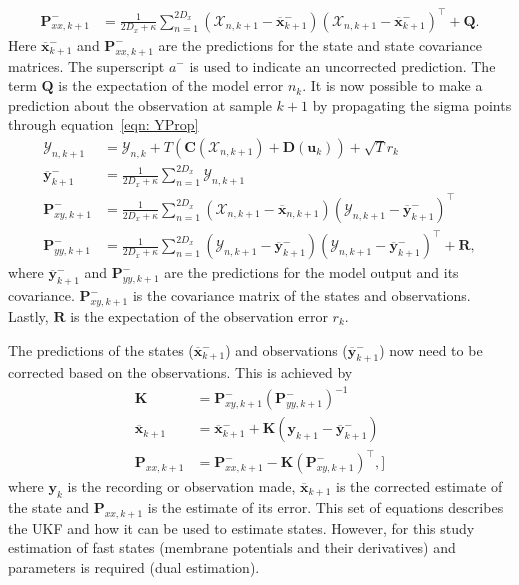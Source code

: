 \begin{align}
\mathbf{P}_{xx,k+1}^{-} &= \frac{1}{2D_{x}+\kappa}\sum_{n=1}^{2D_{x}} (\mathbf{\mathcal{X}}_{n,k+1} -\mathbf{\overline{x}}_{k+1}^{-})(\mathbf{\mathcal{X}}_{n,k+1}-\mathbf{\overline{x}}_{k+1}^{-})^{\top} + \mathbf{Q}.%
\end{align} Here $\overline{\mathbf{x}}_{k+1}^{-}$ and $\mathbf{P}_{xx,k+1}^{-}$ are the predictions for the state and state covariance matrices. The superscript $a^{-}$ is used to indicate an uncorrected prediction. The term $\mathbf{Q}$ is the expectation of the model error $n_{k}$. It is now possible to make a prediction about the observation at sample $k+1$ by propagating the sigma points through equation~\ref{eqn: YProp} \begin{align} %
\mathbf{\mathcal{Y}}_{n,k+1} &= \mathbf{\mathcal{Y}}_{n,k} + T(\mathbf{C}(\mathbf{\mathcal{X}}_{n,k+1})+ \mathbf{D}(\mathbf{u}_{k}))+ \sqrt{T}{r}_{k}\\
\overline{\mathbf{y}}_{k+1}^{-} &= \frac{1}{2D_{x}+\kappa}\sum_{n=1}^{2D_{x}} \mathbf{\mathcal{Y}}_{n,k+1}\\
\label{eqn: statecovg}
\mathbf{P}_{xy,k+1}^{-} &= \frac{1}{2D_{x}+\kappa}\sum_{n=1}^{2D_{x}} (\mathbf{\mathcal{X}}_{n,k+1}-\overline{\mathbf{x}}_{n,k+1}) (\mathbf{\mathcal{Y}}_{n,k+1}-\overline{\mathbf{y}}_{k+1}^{-})^{\top}\\
\mathbf{P}_{yy,k+1}^{-} &= \frac{1}{2D_{x}+\kappa}\sum_{n=1}^{2D_{x}} (\mathbf{\mathcal{Y}}_{n,k+1}-\overline{\mathbf{y}}_{k+1}^{-}) (\mathbf{\mathcal{Y}}_{n,k+1}-\overline{\mathbf{y}}_{k+1}^{-})^{\top} +\mathbf{R},%
\end{align} where $\overline{\mathbf{y}}_{k+1}^{-}$ and $\mathbf{P}_{yy,k+1}^{-}$ are the predictions for the model output and its covariance. $\mathbf{P}_{xy,k+1}^{-}$ is the covariance matrix of the states and observations. Lastly, $\mathbf{R}$ is the expectation of the observation error $r_{k}$.

The predictions of the states ($\overline{\mathbf{x}}_{k+1}^{-}$) and observations ($\overline{\mathbf{y}}_{k+1}^{-}$) now need to be corrected based on the observations. This is achieved by \begin{align}
\mathbf{K} &= \mathbf{P}_{xy,k+1}^{-}(\mathbf{P}_{yy,k+1}^{-})^{-1}\\
\overline{\mathbf{x}}_{k+1} &= \overline{\mathbf{x}}_{k+1}^{-} + \mathbf{K}(\mathbf{y}_{k+1}-\overline{\mathbf{y}}_{k+1}^{-})\\
\mathbf{P}_{xx,k+1} &= \mathbf{P}_{xx,k+1}^{-} - \mathbf{K}(\mathbf{P}_{xy,k+1}^{-})^{\top},]
\end{align} where $\mathbf{y}_{k}$ is the recording or observation made, $\overline{\mathbf{x}}_{k+1}$ is the corrected estimate of the state and $\mathbf{P}_{xx,k+1}$ is the estimate of its error. This set of equations describes the UKF and how it can be used to estimate states. However, for this study estimation of fast states (membrane potentials and their derivatives) and parameters is required (dual estimation).

